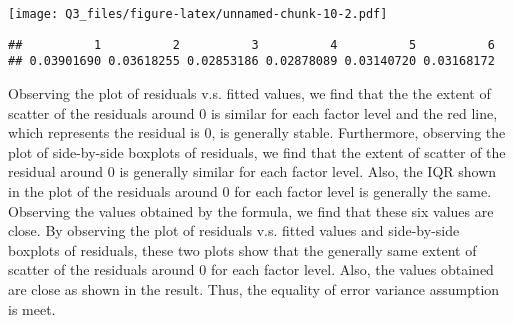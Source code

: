 \documentclass[
]{article}
\newenvironment{Shaded}{\begin{snugshade}}{\end{snugshade}}
\newcommand{\AttributeTok}[1]{\textcolor[rgb]{0.77,0.63,0.00}{#1}}
\newcommand{\DecValTok}[1]{\textcolor[rgb]{0.00,0.00,0.81}{#1}}
\newcommand{\FunctionTok}[1]{\textcolor[rgb]{0.00,0.00,0.00}{#1}}
\newcommand{\NormalTok}[1]{#1}
\newcommand{\OtherTok}[1]{\textcolor[rgb]{0.56,0.35,0.01}{#1}}
\newcommand{\SpecialCharTok}[1]{\textcolor[rgb]{0.00,0.00,0.00}{#1}}
\newcommand{\StringTok}[1]{\textcolor[rgb]{0.31,0.60,0.02}{#1}}
\begin{document}
\texttt{[image: Q3\_files/figure-latex/unnamed-chunk-10-2.pdf]}

\begin{Shaded}
\end{Shaded}

\begin{verbatim}
##          1          2          3          4          5          6 
## 0.03901690 0.03618255 0.02853186 0.02878089 0.03140720 0.03168172
\end{verbatim}

Observing the plot of residuals v.s. fitted values, we find that the the
extent of scatter of the residuals around 0 is similar for each factor
level and the red line, which represents the residual is 0, is generally
stable. Furthermore, observing the plot of side-by-side boxplots of
residuals, we find that the extent of scatter of the residual around 0
is generally similar for each factor level. Also, the IQR shown in the
plot of the residuals around 0 for each factor level is generally the
same. Observing the values obtained by the formula, we find that these
six values are close. By observing the plot of residuals v.s. fitted
values and side-by-side boxplots of residuals, these two plots show that
the generally same extent of scatter of the residuals around 0 for each
factor level. Also, the values obtained are close as shown in the
result. Thus, the equality of error variance assumption is meet.
\end{document}
